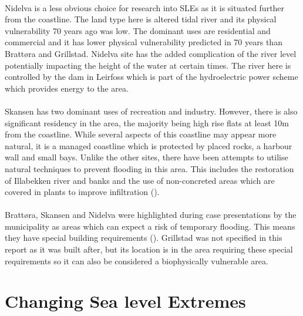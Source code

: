 \paragraph{}
Nidelva is a less obvious choice for research into SLEs as it is situated further from the coastline. The land type here is altered tidal river and its physical vulnerability 70 years ago was low. The dominant uses are residential and commercial and it has lower physical vulnerability predicted in 70 years than Brattøra and Grillstad. Nidelva site has the added complication of the river level potentially impacting the height of the water at certain times. The river here is controlled by the dam in Leirfoss which is part of the hydroelectric power scheme which provides energy to the area.
\paragraph{}
Skansen has two dominant uses of recreation and industry. However, there is also significant residency in the area, the majority being high rise flats at least 10m from the coastline. While several aspects of this coastline may appear more natural, it is a managed coastline which is protected by placed rocks, a harbour wall and small bays. Unlike the other sites, there have been attempts to utilise natural techniques to prevent flooding in this area. This includes the restoration of Illabekken river and banks and the use of non-concreted areas which are covered in plants to improve infiltration (\cite{selliseth_ilabekken_2021}).
\paragraph{}

\paragraph{}
Brattøra, Skansen and Nidelva were highlighted during case presentations by the municipality as areas which can expect a risk of temporary flooding. This means they have special building requirements (\cite{hanssen_saksframlegg_2013}). Grillstad was not specified in this report as it was built after, but its location is in the area requiring these special requirements so it can also be considered a biophysically vulnerable area.  

\section{Changing Sea level Extremes}



